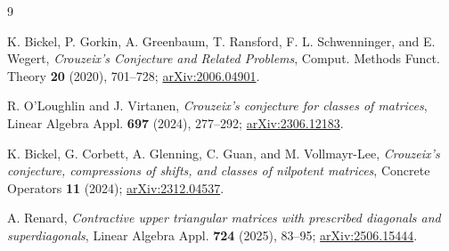 \documentclass[11pt]{article}
\begin{document}
\begin{thebibliography}{9}

K. Bickel, P. Gorkin, A. Greenbaum, T. Ransford, F. L. Schwenninger, and
E. Wegert,
\emph{Crouzeix's Conjecture and Related Problems},
Comput. Methods Funct. Theory \textbf{20} (2020), 701--728;
\href{https://arxiv.org/abs/2006.04901}{arXiv:2006.04901}.

R. O'Loughlin and J. Virtanen,
\emph{Crouzeix's conjecture for classes of matrices},
Linear Algebra Appl. \textbf{697} (2024), 277--292;
\href{https://arxiv.org/abs/2306.12183}{arXiv:2306.12183}.

K. Bickel, G. Corbett, A. Glenning, C. Guan, and M. Vollmayr-Lee,
\emph{Crouzeix's conjecture, compressions of shifts, and classes of nilpotent
matrices}, Concrete Operators \textbf{11} (2024);
\href{https://arxiv.org/abs/2312.04537}{arXiv:2312.04537}.

A. Renard,
\emph{Contractive upper triangular matrices with prescribed diagonals and
superdiagonals}, Linear Algebra Appl. \textbf{724} (2025), 83--95;
\href{https://arxiv.org/abs/2506.15444}{arXiv:2506.15444}.

\end{thebibliography}
\end{document}
